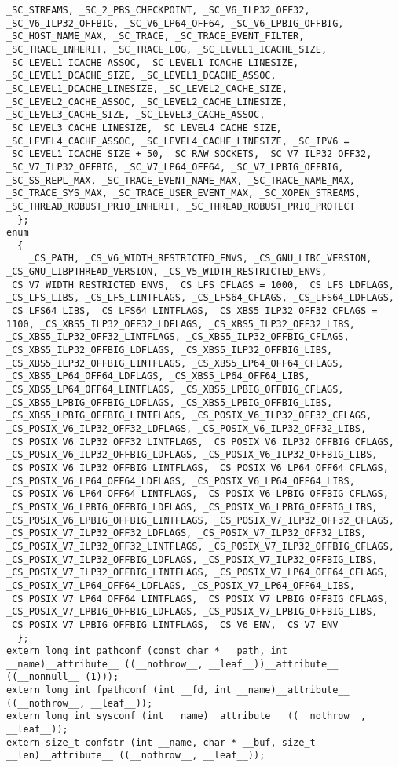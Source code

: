 \documentclass{beamer}
\begin{document}
\begin{frame}[fragile]
\begin{verbatim}
_SC_STREAMS, _SC_2_PBS_CHECKPOINT, _SC_V6_ILP32_OFF32, _SC_V6_ILP32_OFFBIG, _SC_V6_LP64_OFF64, _SC_V6_LPBIG_OFFBIG, _SC_HOST_NAME_MAX, _SC_TRACE, _SC_TRACE_EVENT_FILTER, _SC_TRACE_INHERIT, _SC_TRACE_LOG, _SC_LEVEL1_ICACHE_SIZE, _SC_LEVEL1_ICACHE_ASSOC, _SC_LEVEL1_ICACHE_LINESIZE, _SC_LEVEL1_DCACHE_SIZE, _SC_LEVEL1_DCACHE_ASSOC, _SC_LEVEL1_DCACHE_LINESIZE, _SC_LEVEL2_CACHE_SIZE, _SC_LEVEL2_CACHE_ASSOC, _SC_LEVEL2_CACHE_LINESIZE, _SC_LEVEL3_CACHE_SIZE, _SC_LEVEL3_CACHE_ASSOC, _SC_LEVEL3_CACHE_LINESIZE, _SC_LEVEL4_CACHE_SIZE, _SC_LEVEL4_CACHE_ASSOC, _SC_LEVEL4_CACHE_LINESIZE, _SC_IPV6 = _SC_LEVEL1_ICACHE_SIZE + 50, _SC_RAW_SOCKETS, _SC_V7_ILP32_OFF32, _SC_V7_ILP32_OFFBIG, _SC_V7_LP64_OFF64, _SC_V7_LPBIG_OFFBIG, _SC_SS_REPL_MAX, _SC_TRACE_EVENT_NAME_MAX, _SC_TRACE_NAME_MAX, _SC_TRACE_SYS_MAX, _SC_TRACE_USER_EVENT_MAX, _SC_XOPEN_STREAMS, _SC_THREAD_ROBUST_PRIO_INHERIT, _SC_THREAD_ROBUST_PRIO_PROTECT
  };
enum
  {
    _CS_PATH, _CS_V6_WIDTH_RESTRICTED_ENVS, _CS_GNU_LIBC_VERSION, _CS_GNU_LIBPTHREAD_VERSION, _CS_V5_WIDTH_RESTRICTED_ENVS, _CS_V7_WIDTH_RESTRICTED_ENVS, _CS_LFS_CFLAGS = 1000, _CS_LFS_LDFLAGS, _CS_LFS_LIBS, _CS_LFS_LINTFLAGS, _CS_LFS64_CFLAGS, _CS_LFS64_LDFLAGS, _CS_LFS64_LIBS, _CS_LFS64_LINTFLAGS, _CS_XBS5_ILP32_OFF32_CFLAGS = 1100, _CS_XBS5_ILP32_OFF32_LDFLAGS, _CS_XBS5_ILP32_OFF32_LIBS, _CS_XBS5_ILP32_OFF32_LINTFLAGS, _CS_XBS5_ILP32_OFFBIG_CFLAGS, _CS_XBS5_ILP32_OFFBIG_LDFLAGS, _CS_XBS5_ILP32_OFFBIG_LIBS, _CS_XBS5_ILP32_OFFBIG_LINTFLAGS, _CS_XBS5_LP64_OFF64_CFLAGS, _CS_XBS5_LP64_OFF64_LDFLAGS, _CS_XBS5_LP64_OFF64_LIBS, _CS_XBS5_LP64_OFF64_LINTFLAGS, _CS_XBS5_LPBIG_OFFBIG_CFLAGS, _CS_XBS5_LPBIG_OFFBIG_LDFLAGS, _CS_XBS5_LPBIG_OFFBIG_LIBS, _CS_XBS5_LPBIG_OFFBIG_LINTFLAGS, _CS_POSIX_V6_ILP32_OFF32_CFLAGS, _CS_POSIX_V6_ILP32_OFF32_LDFLAGS, _CS_POSIX_V6_ILP32_OFF32_LIBS, _CS_POSIX_V6_ILP32_OFF32_LINTFLAGS, _CS_POSIX_V6_ILP32_OFFBIG_CFLAGS, _CS_POSIX_V6_ILP32_OFFBIG_LDFLAGS, _CS_POSIX_V6_ILP32_OFFBIG_LIBS, _CS_POSIX_V6_ILP32_OFFBIG_LINTFLAGS, _CS_POSIX_V6_LP64_OFF64_CFLAGS, _CS_POSIX_V6_LP64_OFF64_LDFLAGS, _CS_POSIX_V6_LP64_OFF64_LIBS, _CS_POSIX_V6_LP64_OFF64_LINTFLAGS, _CS_POSIX_V6_LPBIG_OFFBIG_CFLAGS, _CS_POSIX_V6_LPBIG_OFFBIG_LDFLAGS, _CS_POSIX_V6_LPBIG_OFFBIG_LIBS, _CS_POSIX_V6_LPBIG_OFFBIG_LINTFLAGS, _CS_POSIX_V7_ILP32_OFF32_CFLAGS, _CS_POSIX_V7_ILP32_OFF32_LDFLAGS, _CS_POSIX_V7_ILP32_OFF32_LIBS, _CS_POSIX_V7_ILP32_OFF32_LINTFLAGS, _CS_POSIX_V7_ILP32_OFFBIG_CFLAGS, _CS_POSIX_V7_ILP32_OFFBIG_LDFLAGS, _CS_POSIX_V7_ILP32_OFFBIG_LIBS, _CS_POSIX_V7_ILP32_OFFBIG_LINTFLAGS, _CS_POSIX_V7_LP64_OFF64_CFLAGS, _CS_POSIX_V7_LP64_OFF64_LDFLAGS, _CS_POSIX_V7_LP64_OFF64_LIBS, _CS_POSIX_V7_LP64_OFF64_LINTFLAGS, _CS_POSIX_V7_LPBIG_OFFBIG_CFLAGS, _CS_POSIX_V7_LPBIG_OFFBIG_LDFLAGS, _CS_POSIX_V7_LPBIG_OFFBIG_LIBS, _CS_POSIX_V7_LPBIG_OFFBIG_LINTFLAGS, _CS_V6_ENV, _CS_V7_ENV
  };
extern long int pathconf (const char * __path, int __name)__attribute__ ((__nothrow__, __leaf__))__attribute__ ((__nonnull__ (1)));
extern long int fpathconf (int __fd, int __name)__attribute__ ((__nothrow__, __leaf__));
extern long int sysconf (int __name)__attribute__ ((__nothrow__, __leaf__));
extern size_t confstr (int __name, char * __buf, size_t __len)__attribute__ ((__nothrow__, __leaf__));
\end{verbatim}
\end{frame}
\end{document}
